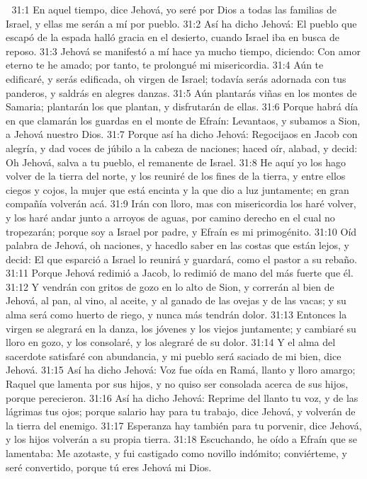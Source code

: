 
31:1 En aquel tiempo, dice Jehová, yo seré por Dios a todas las familias de Israel, y ellas me serán a mí por pueblo.  
31:2 Así ha dicho Jehová: El pueblo que escapó de la espada halló gracia en el desierto, cuando Israel iba en busca de reposo.  
31:3 Jehová se manifestó a mí hace ya mucho tiempo, diciendo: Con amor eterno te he amado; por tanto, te prolongué mi misericordia.  
31:4 Aún te edificaré, y serás edificada, oh virgen de Israel; todavía serás adornada con tus panderos, y saldrás en alegres danzas.  
31:5 Aún plantarás viñas en los montes de Samaria; plantarán los que plantan, y disfrutarán de ellas.  
31:6 Porque habrá día en que clamarán los guardas en el monte de Efraín: Levantaos, y subamos a Sion, a Jehová nuestro Dios.  
31:7 Porque así ha dicho Jehová: Regocijaos en Jacob con alegría, y dad voces de júbilo a la cabeza de naciones; haced oír, alabad, y decid: Oh Jehová, salva a tu pueblo, el remanente de Israel.  
31:8 He aquí yo los hago volver de la tierra del norte, y los reuniré de los fines de la tierra, y entre ellos ciegos y cojos, la mujer que está encinta y la que dio a luz juntamente; en gran compañía volverán acá.  
31:9 Irán con lloro, mas con misericordia los haré volver, y los haré andar junto a arroyos de aguas, por camino derecho en el cual no tropezarán; porque soy a Israel por padre, y Efraín es mi primogénito.  
31:10 Oíd palabra de Jehová, oh naciones, y hacedlo saber en las costas que están lejos, y decid: El que esparció a Israel lo reunirá y guardará, como el pastor a su rebaño.  
31:11 Porque Jehová redimió a Jacob, lo redimió de mano del más fuerte que él.  
31:12 Y vendrán con gritos de gozo en lo alto de Sion, y correrán al bien de Jehová, al pan, al vino, al aceite, y al ganado de las ovejas y de las vacas; y su alma será como huerto de riego, y nunca más tendrán dolor.  
31:13 Entonces la virgen se alegrará en la danza, los jóvenes y los viejos juntamente; y cambiaré su lloro en gozo, y los consolaré, y los alegraré de su dolor.  
31:14 Y el alma del sacerdote satisfaré con abundancia, y mi pueblo será saciado de mi bien, dice Jehová.  
31:15 Así ha dicho Jehová: Voz fue oída en Ramá, llanto y lloro amargo; Raquel que lamenta por sus hijos, y no quiso ser consolada acerca de sus hijos, porque perecieron. 
31:16 Así ha dicho Jehová: Reprime del llanto tu voz, y de las lágrimas tus ojos; porque salario hay para tu trabajo, dice Jehová, y volverán de la tierra del enemigo.  
31:17 Esperanza hay también para tu porvenir, dice Jehová, y los hijos volverán a su propia tierra.  
31:18 Escuchando, he oído a Efraín que se lamentaba: Me azotaste, y fui castigado como novillo indómito; conviérteme, y seré convertido, porque tú eres Jehová mi Dios.  
